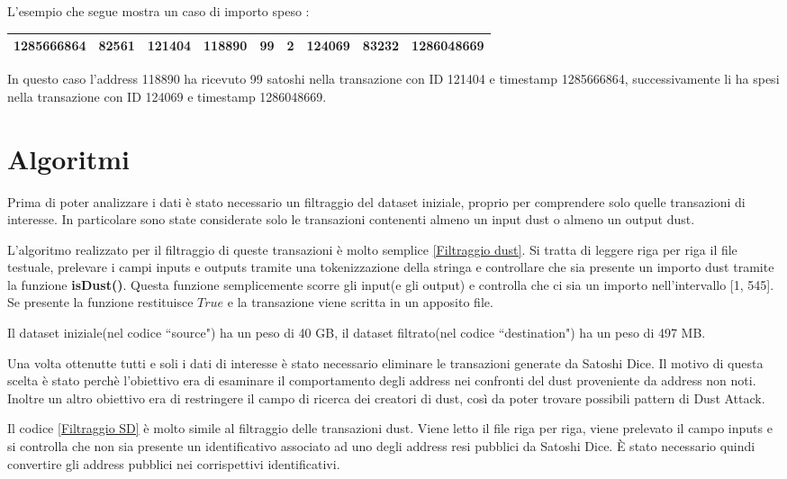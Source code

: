 L'esempio che segue mostra un caso di importo speso :
\begin{table}[h]
\centering
\begin{tabular}{|l|l|l|l|l|l|l|l|l|}
\toprule
1285666864 &    82561 & 121404 &  118890 &      99 &           2 &       124069 &       83232 &      1286048669\\
\bottomrule
\end{tabular}
\end{table}
\FloatBarrier
In questo caso l'address 118890 ha ricevuto 99 satoshi nella transazione con ID 121404 e timestamp 1285666864, successivamente li ha spesi nella transazione con ID 124069 e timestamp 1286048669.\\
\section{Algoritmi}
Prima di poter analizzare i dati è stato necessario un filtraggio del dataset iniziale, proprio per comprendere solo quelle transazioni di interesse. In particolare sono state considerate solo le transazioni contenenti almeno un input dust o almeno un output dust. 

L'algoritmo realizzato per il filtraggio di queste transazioni è molto semplice \ref{Filtraggio dust}. Si tratta di leggere riga per riga il file testuale, prelevare i campi inputs e outputs tramite una tokenizzazione della stringa e controllare che sia presente un importo dust tramite la funzione \textbf{isDust()}. Questa funzione semplicemente scorre gli input(e gli output) e controlla che ci sia un importo nell'intervallo [1, 545]. Se presente la funzione restituisce $True$ e la transazione viene scritta in un apposito file.

Il dataset iniziale(nel codice ``source") ha un peso di 40 GB, il dataset filtrato(nel codice ``destination") ha un peso di 497 MB. 

Una volta ottenutte tutti e soli i dati di interesse è stato necessario eliminare le transazioni generate da Satoshi Dice. Il motivo di questa scelta è stato perchè l'obiettivo era di esaminare il comportamento degli address nei confronti del dust proveniente da address non noti. Inoltre un altro obiettivo era di restringere il campo di ricerca dei creatori di dust, così da poter trovare possibili pattern di Dust Attack.

Il codice \ref{Filtraggio SD} è molto simile al filtraggio delle transazioni dust. Viene letto il file riga per riga, viene prelevato il campo inputs e si controlla che non sia presente un identificativo associato ad uno degli address resi pubblici da Satoshi Dice. È stato necessario quindi convertire gli address pubblici nei corrispettivi identificativi.

